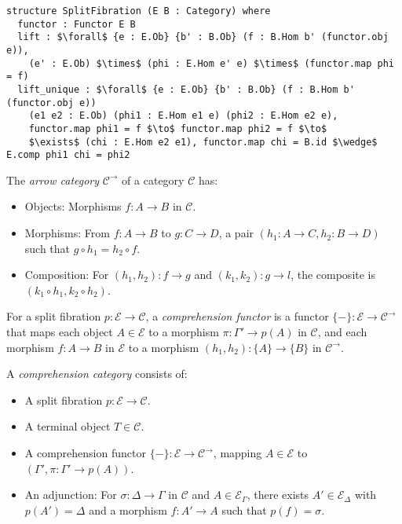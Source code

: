 \documentclass{article}
\begin{document}
\begin{lstlisting}[mathescape=true]
structure SplitFibration (E B : Category) where
  functor : Functor E B
  lift : $\forall$ {e : E.Ob} {b' : B.Ob} (f : B.Hom b' (functor.obj e)),
    (e' : E.Ob) $\times$ (phi : E.Hom e' e) $\times$ (functor.map phi = f)
  lift_unique : $\forall$ {e : E.Ob} {b' : B.Ob} (f : B.Hom b' (functor.obj e))
    (e1 e2 : E.Ob) (phi1 : E.Hom e1 e) (phi2 : E.Hom e2 e),
    functor.map phi1 = f $\to$ functor.map phi2 = f $\to$
    $\exists$ (chi : E.Hom e2 e1), functor.map chi = B.id $\wedge$ E.comp phi1 chi = phi2
\end{lstlisting}

\begin{definition}
The \emph{arrow category} \(\mathcal{C}^\to\) of a category \(\mathcal{C}\) has:
\begin{itemize}
    \item Objects: Morphisms \(f : A \to B\) in \(\mathcal{C}\).
    \item Morphisms: From \(f : A \to B\) to \(g : C \to D\), a pair \((h_1 : A \to C, h_2 : B \to D)\) such that \(g \circ h_1 = h_2 \circ f\).
    \item Composition: For \((h_1, h_2) : f \to g\) and \((k_1, k_2) : g \to l\), the composite is \((k_1 \circ h_1, k_2 \circ h_2)\).
\end{itemize}
\end{definition}

\begin{definition}
For a split fibration \(p : \mathcal{E} \to \mathcal{C}\), a \emph{comprehension functor} is a functor \(\{-\} : \mathcal{E} \to \mathcal{C}^\to\) that maps each object \(A \in \mathcal{E}\) to a morphism \(\pi : \Gamma' \to p(A)\) in \(\mathcal{C}\), and each morphism \(f : A \to B\) in \(\mathcal{E}\) to a morphism \((h_1, h_2) : \{A\} \to \{B\}\) in \(\mathcal{C}^\to\).
\end{definition}

\begin{definition}
A \emph{comprehension category} consists of:
\begin{itemize}
    \item A split fibration \(p : \mathcal{E} \to \mathcal{C}\).
    \item A terminal object \(T \in \mathcal{C}\).
    \item A comprehension functor \(\{-\} : \mathcal{E} \to \mathcal{C}^\to\), mapping \(A \in \mathcal{E}\) to \((\Gamma', \pi : \Gamma' \to p(A))\).
    \item An adjunction: For \(\sigma : \Delta \to \Gamma\) in \(\mathcal{C}\) and \(A \in \mathcal{E}_\Gamma\), there exists \(A' \in \mathcal{E}_\Delta\) with \(p(A') = \Delta\) and a morphism \(f : A' \to A\) such that \(p(f) = \sigma\).
\end{itemize}
\end{definition}
\end{document}
